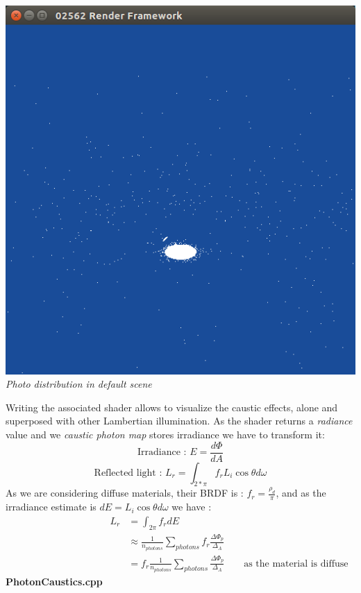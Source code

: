 \documentclass[a4,12pt]{article}
\begin{document}
	\begin{center}
		\begin{minipage}[b]{0.40\linewidth}
			\begin{center}
				\includegraphics[width = \textwidth]{./Worksheet6/causticphotons.png}\\
				\textit{Photo distribution in default scene}
			\end{center}
		\end{minipage}
	\end{center}
	
	Writing the associated shader allows to visualize the caustic effects, alone and superposed with other Lambertian illumination. As the shader returns a \textit{radiance} value and we \textit{caustic photon map} stores irradiance we have to transform it:
	$$
	\text{Irradiance : } E = \frac{d\Phi}{dA}
	$$
	$$
	\text{Reflected light : } L_r = \int_{2*\pi} f_r L_i \cos{\theta} d\omega
	$$
	As we are considering diffuse materials, their BRDF is : $ f_r = \frac{\rho_d}{\pi}$, and as the irradiance estimate is $dE = L_i \cos{\theta} d\omega$ we have :
	\begin{align*}
	\hspace{10em} L_r &= \int_{2\pi} f_r dE\\
	&\approx \frac{1}{n_{photons}} \sum_{photons} f_r \frac{\Delta \Phi_p}{\Delta_A}\\
	&= f_r \frac{1}{n_{photons}} \sum_{photons} \frac{\Delta \Phi_p}{\Delta_A} \hspace{2em} \text{as the material is diffuse}
	\end{align*}
	\textbf{PhotonCaustics.cpp}
	
\end{document}
